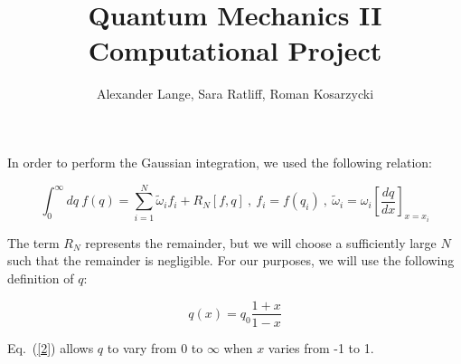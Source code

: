 \documentclass{homework}
\title{Quantum Mechanics II Computational Project}
\author{Alexander Lange, Sara Ratliff, Roman Kosarzycki}
\begin{document}
\maketitle

In order to perform the Gaussian integration, we used the following relation:

\begin{equation}
\label{1}
\int^{\infty}_0 dq \ f(q) = \sum^N_{i=1} \tilde{\omega}_if_i + R_N[f,q] \ , \ f_i=f(q_i) \ , \ \tilde{\omega}_i = \omega_i \left[ \frac{dq}{dx} \right]_{x=x_i}
\end{equation}

The term $R_N$ represents the remainder, but we will choose a sufficiently large $N$ such that the remainder is negligible. For our purposes, we will use the following definition of $q$:

\begin{equation}
\label{2}
q(x)= q_0 \frac{1+x}{1-x}
\end{equation}

Eq.~(\ref{2}) allows $q$ to vary from 0 to $\infty$ when $x$ varies from -1 to 1. 
\end{document}
